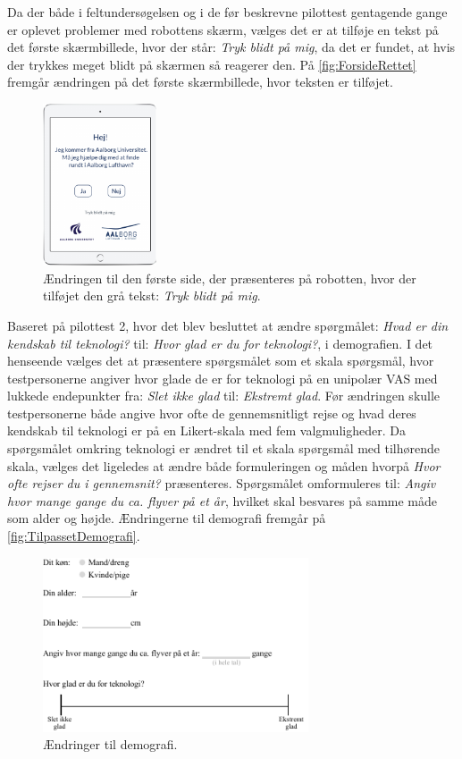 Da der både i feltundersøgelsen og i de før beskrevne pilottest gentagende gange er oplevet problemer med robottens skærm, vælges det er at tilføje en tekst på det første skærmbillede, hvor der står: \textit{Tryk blidt på mig}, da det er fundet, at hvis der trykkes meget blidt på skærmen så reagerer den. På \autoref{fig:ForsideRettet} fremgår ændringen på det første skærmbillede, hvor teksten er tilføjet.    
%
\begin{figure}[H]
\centering
\includegraphics[width = 0.3\textwidth]{Figure/TestdesignEvaluering/ForsideRettet} 
\caption{Ændringen til den første side, der præsenteres på robotten, hvor der tilføjet den grå tekst: \textit{Tryk blidt på mig}.}
\label{fig:ForsideRettet}
\end{figure}
\noindent
%
Baseret på pilottest 2, hvor det blev besluttet at ændre spørgmålet: \textit{Hvad er din kendskab til teknologi?} til: \textit{Hvor glad er du for teknologi?}, i demografien. I det henseende vælges det at præsentere spørgsmålet som et skala spørgsmål, hvor testpersonerne angiver hvor glade de er for teknologi på en unipolær VAS med lukkede endepunkter fra: \textit{Slet ikke glad} til: \textit{Ekstremt glad}. Før ændringen skulle testpersonerne både angive hvor ofte de gennemsnitligt rejse og hvad deres kendskab til teknologi er på en Likert-skala med fem valgmuligheder. Da spørgsmålet omkring teknologi er ændret til et skala spørgsmål med tilhørende skala, vælges det ligeledes at ændre både formuleringen og måden hvorpå \textit{Hvor ofte rejser du i gennemsnit?} præsenteres. Spørgsmålet omformuleres til: \textit{Angiv hvor mange gange du ca. flyver på et år}, hvilket skal besvares på samme måde som alder og højde. Ændringerne til demografi fremgår på \autoref{fig:TilpassetDemografi}.
%
\begin{figure}[H]
\centering
\includegraphics[width = 0.7\textwidth]{Figure/TestdesignEvaluering/TilpassetDemografi} 
\caption{Ændringer til demografi.}
\label{fig:TilpassetDemografi}
\end{figure}

